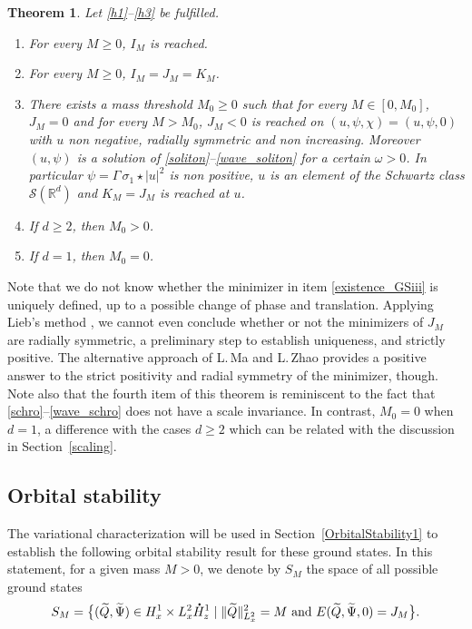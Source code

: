 \documentclass[10pt]{amsart}
\newenvironment{enumeratei}
{\bgroup\def\theenumi{\roman{enumi}}\def\theenumii{\arabic{enumii}}\begin{enumerate}}
{\end{enumerate}\egroup}
\newtheorem{theo}[lemma]{Theorem}
\theoremstyle{definition}
\newcommand*{\overbigdot}[1]{%
\accentset{\mbox{\large\bfseries .}}{#1}}
\newcommand{\R}{\mathbb{R}}
\begin{document}
\begin{theo}\label{existence_GS}
Let \eqref{h1}--\eqref{h3} be fulfilled.
\begin{enumeratei}
\item\label{existence_GSi} For every $M\geq 0$, $I_{M}$ is reached.
\item\label{existence_GSii}
For every $M\geq 0$, $I_{M}=J_{M}=K_{M}$.
\item\label{existence_GSiii}
There exists a mass threshold $M_{0}\geq 0$ such that for every $M\in[0,M_{0}]$, $J_{M}=0$ and for every $M>M_{0}$, $J_{M}<0$ is reached on $(u,\psi,\chi)=(u,\psi,0)$ with $u$ non negative, radially symmetric and non increasing. Moreover $(u,\psi)$ is a solution of \eqref{soliton}--\eqref{wave_soliton} for a certain $\omega>0$. In particular $\psi=\Gamma\,\sigma_{1}\star|u|^{2}$ is non positive, $u$ is an element of the Schwartz class $\mathcal{S}(\R^{d})$ and $K_{M}=J_{M}$ is reached at $u$.
\item\label{existence_GSiv}
If $d\geq 2$, then $M_{0}>0$.
\item\label{existence_GSv}
If $d=1$, then $M_{0}=0$.
\end{enumeratei}
\end{theo}

Note that we do not know whether the minimizer in item \eqref{existence_GSiii} is uniquely defined, up to a possible change of phase and translation.
Applying Lieb's method \cite{Lieb_Choquard}, we cannot even conclude whether or not the minimizers of $J_{M}$ are
radially symmetric, a preliminary step
to establish uniqueness, and strictly positive.
The alternative approach of L.\,Ma and L.\,Zhao \cite[\S 5]{MaZ} provides a positive answer to the strict positivity and radial symmetry of the minimizer, though.
Note also that the fourth item of this theorem is reminiscent to the fact that \eqref{schro}--\eqref{wave_schro} does not have a scale invariance. In contrast,
$M_{0}=0$ when $d=1$, a difference with the cases $d\geq 2$ which can be related with the discussion in Section~\ref{scaling}.

\subsection{Orbital stability}

The variational characterization will be used in Section~\ref{OrbitalStability1} to establish the following orbital stability result for these ground states. In this statement, for a given mass $M>0$, we denote by $S_{M}$ the space of all possible ground states
\[
S_{M}=\bigl\{(\widetilde{Q},\widetilde{\Psi})\in H_{x}^{1}\times L_{x}^{2}\overbigdot{H}_{z}^{1}\mid\|\widetilde{Q}\|_{L_{x}^{2}}^{2}=M\text{ and }E(\widetilde{Q},\widetilde{\Psi},0)=J_{M}\bigr\}.
\]
\end{document}
